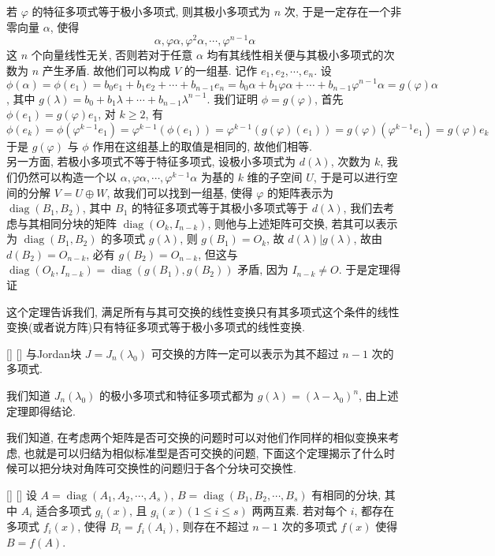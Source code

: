 \documentclass[UTF8]{ctexart}
\DeclareMathOperator{\0}{\mathbf{0}}
\DeclareMathOperator{\<}{\langle}
\renewcommand{\>}{\rangle}
\DeclareMathOperator{\diag}{diag}
\begin{document}
		\begin{prf}
			若 \(\varphi\) 的特征多项式等于极小多项式, 则其极小多项式为 \(n\) 次, 于是一定存在一个非零向量 \(\alpha\), 使得
			\[\alpha,\varphi\alpha,\varphi^2\alpha,\cdots,\varphi^{n-1}\alpha\]
			这 \(n\) 个向量线性无关, 否则若对于任意 \(\alpha\) 均有其线性相关便与其极小多项式的次数为 \(n\) 产生矛盾. 故他们可以构成 \(V\) 的一组基. 记作 \(e_1,e_2,\cdots,e_n\). 设
			\[\phi(\alpha)=\phi(e_1)=b_0e_1+b_1e_2+\cdots+b_{n-1}e_n=b_0\alpha+b_1\varphi\alpha+\cdots+b_{n-1}\varphi^{n-1}\alpha=g(\varphi)\alpha\], 
			其中 \(g(\lambda)=b_0+b_1\lambda+\cdots+b_{n-1}\lambda^{n-1}\). 我们证明 \(\phi=g(\varphi)\), 首先 \(\phi(e_1)=g(\varphi)e_1\), 对 \(k\geq2\), 有
			\[\phi(e_k)=\phi(\varphi^{k-1}e_1)=\varphi^{k-1}(\phi(e_1))=\varphi^{k-1}(g(\varphi)(e_1))=g(\varphi)(\varphi^{k-1}e_1)=g(\varphi)e_k\]
			于是 \(g(\varphi)\) 与 \(\phi\) 作用在这组基上的取值是相同的, 故他们相等.\\
			另一方面, 若极小多项式不等于特征多项式, 设极小多项式为 \(d(\lambda)\), 次数为 \(k\), 我们仍然可以构造一个以 \({\alpha,\varphi\alpha,\cdots,\varphi^{k-1}\alpha}\) 为基的 \(k\) 维的子空间 \(U\), 于是可以进行空间的分解 \(V=U\oplus W\), 故我们可以找到一组基, 使得 \(\varphi\) 的矩阵表示为 \(\diag(B_1,B_2)\), 其中 \(B_1\) 的特征多项式等于其极小多项式等于 \(d(\lambda)\), 我们去考虑与其相同分块的矩阵 \(\diag(O_k,I_{n-k})\), 则他与上述矩阵可交换, 若其可以表示为 \(\diag(B_1,B_2)\) 的多项式 \(g(\lambda)\), 则 \(g(B_1)=O_k\), 故 \(d(\lambda)|g(\lambda)\), 故由 \(d(B_2)=O_{n-k}\), 必有 \(g(B_2)=O_{n-k}\), 但这与 \(\diag(O_k,I_{n-k})=\diag(g(B_1),g(B_2))\) 矛盾, 因为 \(I_{n-k}\neq O\). 于是定理得证
		\end{prf}
		这个定理告诉我们, 满足所有与其可交换的线性变换只有其多项式这个条件的线性变换(或者说方阵)只有特征多项式等于极小多项式的线性变换.
		\begin{crl}
			[]
			{}
			[]
			[]
			与Jordan块 \(J=J_n(\lambda_0)\) 可交换的方阵一定可以表示为其不超过 \(n-1\) 次的多项式.
		\end{crl}
		\begin{prf}
			我们知道 \(J_n(\lambda_0)\) 的极小多项式和特征多项式都为 \(g(\lambda)=(\lambda-\lambda_0)^{n}\), 由上述定理即得结论. 
		\end{prf}
		我们知道, 在考虑两个矩阵是否可交换的问题时可以对他们作同样的相似变换来考虑, 也就是可以归结为相似标准型是否可交换的问题, 下面这个定理揭示了什么时候可以把分块对角阵可交换性的问题归于各个分块可交换性.
		\begin{thm}
			[]
			{}
			[]
			[]
			设 \(A=\diag(A_1,A_2,\cdots,A_s)\),  \(B=\diag(B_1,B_2,\cdots,B_s)\) 有相同的分块, 其中 \(A_i\) 适合多项式 \(g_i(x)\), 且 \(g_i(x)(1\leq i\leq s)\) 两两互素. 若对每个 \(i\), 都存在多项式 \(f_i(x)\), 使得 \(B_i=f_i(A_i)\), 则存在不超过 \(n-1\) 次的多项式 \(f(x)\) 使得 \(B=f(A)\).
		\end{thm}
\end{document}

